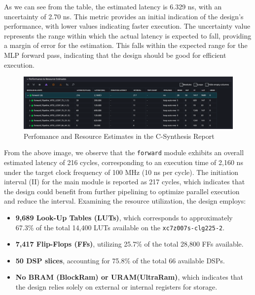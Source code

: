 \documentclass{article}
\begin{document}
As we can see from the table, the estimated latency is 6.329 ns, with an uncertainty of 2.70 ns. This metric provides an initial indication of the design's performance, with lower values indicating faster execution. The uncertainty value represents the range within which the actual latency is expected to fall, providing a margin of error for the estimation. This falls within the expected range for the MLP forward pass, indicating that the design should be good for efficient execution.

\begin{figure}[H]
    \centering
    \includegraphics[width=1\textwidth]{./assets/MLP/c-synthesis-performanceandresourceestimaes.png}
    \caption{Perfomance and Resource Estimates in the C-Synthesis Report}
    \label{fig:c-synthesis-performance-resources}
\end{figure}

From the above image, we observe that the \texttt{forward} module exhibits an overall estimated latency of 216 cycles, corresponding to an execution time of 2,160 ns under the target clock frequency of 100 MHz (10 ns per cycle). The initiation interval (II) for the main module is reported as 217 cycles, which indicates that the design could benefit from further pipelining to optimize parallel execution and reduce the interval. Examining the resource utilization, the design employs:
\begin{itemize}
    \item \textbf{9,689 Look-Up Tables (LUTs)}, which corresponds to approximately 67.3\% of the total 14,400 LUTs available on the \texttt{xc7z007s-clg225-2}.
    \item \textbf{7,417 Flip-Flops (FFs)}, utilizing 25.7\% of the total 28,800 FFs available.
    \item \textbf{50 DSP slices}, accounting for 75.8\% of the total 66 available DSPs.
    \item \textbf{No BRAM (BlockRam) or URAM(UltraRam)}, which indicates that the design relies solely on external or internal registers for storage.
\end{itemize}
\end{document}
